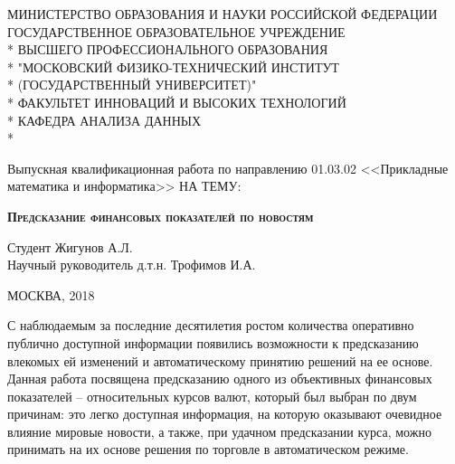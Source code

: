 \documentclass[pdftex,ptm,12pt,a4paper]{report}
\begin{document}
\begin{titlepage}

\newpage

\begin{center}
МИНИСТЕРСТВО ОБРАЗОВАНИЯ И НАУКИ РОССИЙСКОЙ ФЕДЕРАЦИИ \\
\vspace{0.5cm}
ГОСУДАРСТВЕННОЕ ОБРАЗОВАТЕЛЬНОЕ УЧРЕЖДЕНИЕ \\*
ВЫСШЕГО ПРОФЕССИОНАЛЬНОГО ОБРАЗОВАНИЯ\\*
"МОСКОВСКИЙ ФИЗИКО-ТЕХНИЧЕСКИЙ ИНСТИТУТ \\*
(ГОСУДАРСТВЕННЫЙ УНИВЕРСИТЕТ)" \\*
\vspace{0.5cm}
ФАКУЛЬТЕТ ИННОВАЦИЙ И ВЫСОКИХ ТЕХНОЛОГИЙ \\*
КАФЕДРА АНАЛИЗА ДАННЫХ \\*
\hrulefill
\end{center}


\vspace{8em}

\begin{center}
\Large Выпускная квалификационная работа по направлению 01.03.02 <<Прикладные математика и информатика>> \linebreak НА ТЕМУ:
\end{center}

\vspace{2.5em}

\begin{center}
\textsc{\large{\textbf{Предсказание финансовых показателей по новостям}}}
\end{center}

\vspace{7em}

\begin{flushleft}
Студент \hrulefill Жигунов А.Л. \\
\vspace{1.5em}
Научный руководитель д.т.н. \hrulefill Трофимов И.А.\\
\end{flushleft}

\vspace{\fill}

\begin{center}
МОСКВА, 2018
\end{center}

\end{titlepage}

С наблюдаемым за последние десятилетия ростом количества оперативно публично доступной информации появились возможности к предсказанию влекомых ей изменений и автоматическому принятию решений на ее основе.
Данная работа посвящена предсказанию одного из объективных финансовых показателей -- относительных курсов валют, который был выбран по двум причинам: это легко доступная информация, на которую оказывают очевидное влияние мировые новости, а также, при удачном предсказании курса, можно принимать на их основе решения по торговле в автоматическом режиме.
\end{document}
